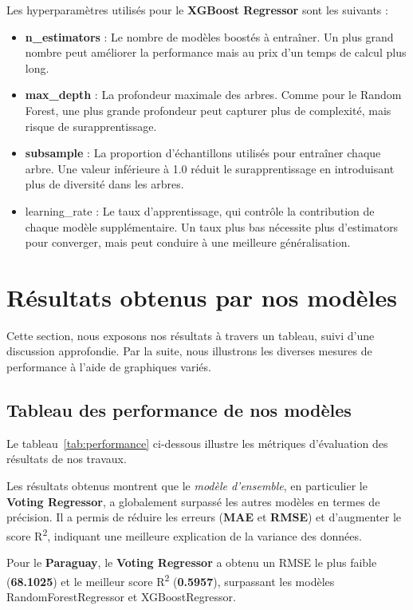 Les hyperparamètres utilisés pour le \textbf{XGBoost Regressor} sont les suivants :
\begin{itemize}
	\item \textbf{n\_estimators} : Le nombre de modèles boostés à entraîner. Un plus grand nombre peut améliorer la performance mais au prix d'un temps de calcul plus long.
	\item \textbf{max\_depth} : La profondeur maximale des arbres. Comme pour le Random Forest, une plus grande profondeur peut capturer plus de complexité, mais risque de surapprentissage.
	\item \textbf{subsample} : La proportion d'échantillons utilisés pour entraîner chaque arbre. Une valeur inférieure à 1.0 réduit le surapprentissage en introduisant plus de diversité dans les arbres.
	\item \textsf{learning\_rate} : Le taux d'apprentissage, qui contrôle la contribution de chaque modèle supplémentaire. Un taux plus bas nécessite plus d'estimators pour converger, mais peut conduire à une meilleure généralisation.
\end{itemize}

\section{Résultats obtenus par nos modèles}
Cette section, nous exposons nos résultats à travers un tableau, suivi d’une discussion approfondie. Par la suite, nous illustrons les diverses mesures de performance à l’aide de graphiques variés.
\subsection{Tableau des performance de nos modèles}
Le tableau~\ref{tab:performance} ci-dessous illustre les métriques d’évaluation des résultats de nos travaux.

Les résultats obtenus montrent que le \textit{modèle d'ensemble}, en particulier le \textbf{Voting Regressor}, a globalement surpassé les autres modèles en termes de précision. Il a permis de réduire les erreurs (\textbf{MAE} et \textbf{RMSE}) et d'augmenter le score R\textsuperscript{2}, indiquant une meilleure explication de la variance des données.

Pour le \textbf{Paraguay}, le \textbf{Voting Regressor} a obtenu un RMSE le plus faible (\textbf{68.1025}) et le meilleur score R\textsuperscript{2} (\textbf{0.5957}), surpassant les modèles RandomForestRegressor et XGBoostRegressor.

